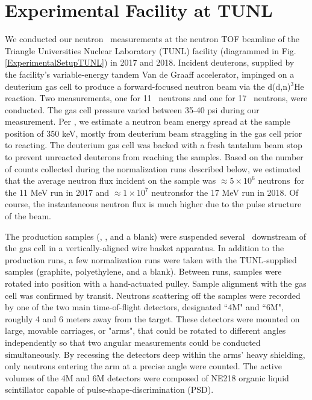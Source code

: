 \section{Experimental Facility at TUNL}
We conducted our neutron \el\ measurements at the neutron TOF
beamline of the Triangle Universities Nuclear Laboratory (TUNL) facility
(diagrammed in Fig. \ref{ExperimentalSetupTUNL}) in 2017 and 2018.
Incident deuterons, supplied by the
facility's variable-energy tandem Van de Graaff accelerator, impinged on a deuterium
gas cell to produce a forward-focused neutron beam via the d(d,n)$^{3}$He reaction.
Two measurements, one for 11 \mega\electronvolt\
neutrons and one for 17 \mega\electronvolt\ neutrons, were
conducted. The gas cell pressure varied between 35-40 psi during our
measurement. Per \cite{GussPhDThesis}, we estimate a neutron beam energy spread
at the sample position of 350 keV, mostly from deuterium beam straggling
in the gas cell prior to reacting. The deuterium gas cell
was backed with a fresh tantalum beam stop to prevent unreacted deuterons from
reaching the samples. Based on the number of counts collected during the
normalization runs described below, we estimated that the average neutron flux incident
on the sample was $\approx5\times10^{6}$ neutrons\per\second\ for the 11 MeV run
in 2017 and $\approx1\times10^{7}$ neutrons\per\second for the 17 MeV run in
2018. Of course, the instantaneous neutron flux is much higher due to the pulse
structure of the beam.

The production samples (\snTwelve, \snFour, and a blank) were suspended several
\centi\meter\ downstream of the gas cell in a vertically-aligned wire basket apparatus.
In addition to the production runs, a few normalization runs were taken
with the TUNL-supplied samples (graphite, polyethylene, and a blank).
Between runs, samples were rotated into position
with a hand-actuated pulley. Sample alignment with the gas cell was confirmed
by transit. Neutrons scattering off the samples were recorded by one
of the two main time-of-flight
detectors, designated ``4M" and ``6M", roughly 4 and 6 meters away from the target.
These detectors were mounted on large, movable carriages, or "arms",
that could be rotated to different angles independently so that two angular
measurements could be conducted simultaneously. By recessing the detectors deep within
the arms' heavy shielding, only neutrons entering the arm at a precise angle
were counted. The active volumes of the 4M and 6M detectors were composed of
NE218 organic liquid scintillator capable of pulse-shape-discrimination (PSD).

